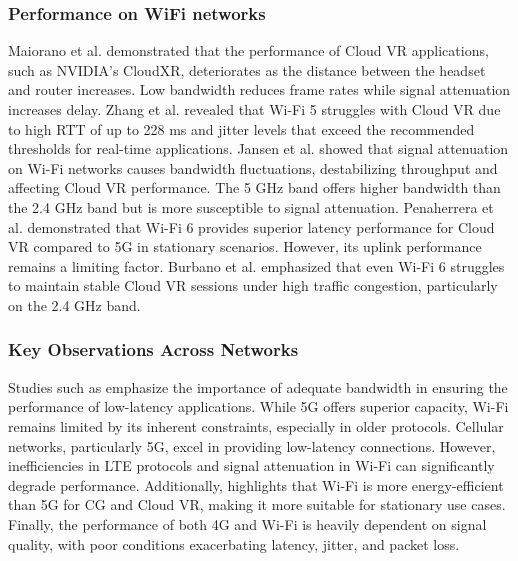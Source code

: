 \subsubsection{Performance on WiFi networks}
Maiorano et al. \cite{maiorano2022local} demonstrated that the performance of Cloud VR applications, such as NVIDIA’s CloudXR, deteriorates as the distance between the headset and router increases. Low bandwidth reduces frame rates while signal attenuation increases delay.
Zhang et al. \cite{zhang2018wifi} revealed that Wi-Fi 5 struggles with Cloud VR due to high \ac{RTT} of up to 228 ms and jitter levels that exceed the recommended thresholds for real-time applications.
Jansen et al. \cite{jansen2023can} showed that signal attenuation on Wi-Fi networks causes bandwidth fluctuations, destabilizing throughput and affecting Cloud VR performance. The 5 GHz band offers higher bandwidth than the 2.4 GHz band but is more susceptible to signal attenuation.
Penaherrera et al. \cite{penaherrera2024cloud} demonstrated that Wi-Fi 6 provides superior latency performance for Cloud VR compared to 5G in stationary scenarios. However, its uplink performance remains a limiting factor.
Burbano et al. \cite{burbano2024impact} emphasized that even Wi-Fi 6 struggles to maintain stable Cloud VR sessions under high traffic congestion, particularly on the 2.4 GHz band.



\subsubsection{Key Observations Across Networks}

Studies such as \cite{Domenico2021ANA, bhuyan2022end} emphasize the importance of adequate bandwidth in ensuring the performance of low-latency applications. While 5G offers superior capacity, Wi-Fi remains limited by its inherent constraints, especially in older protocols. Cellular networks, particularly 5G, excel in providing low-latency connections. However, inefficiencies in LTE protocols and signal attenuation in Wi-Fi can significantly degrade performance. Additionally, \cite{bhuyan2022end} highlights that Wi-Fi is more energy-efficient than 5G for CG and Cloud VR, making it more suitable for stationary use cases. Finally, the performance of both 4G and Wi-Fi is heavily dependent on signal quality, with poor conditions exacerbating latency, jitter, and packet loss.





